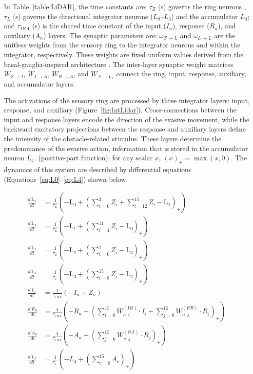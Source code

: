 In Table~\ref{table:LiDAR}, the time constants are: $\tau_{Z}$ (s) governs the ring neurons , $\tau_{L}$ (s) governs the directional integrator neurons ($L_0$--$L_3$) and the accumulator $L_4$; and $\tau_{IRA}$ (s) is the shared time constant of the input ($I_n$), response ($R_n$), and auxiliary ($A_n$) layers.
The synaptic parameters are:  $\omega_{Z\rightarrow L}$ and $\omega_{L\rightarrow L}$ are the unitless weights from the sensory ring to the integrator neurons and within the integrator, respectively. These weights are fixed uniform values derived from the basal-ganglia-inspired architecture \citep{sarvestani2013computational}.
The inter-layer synaptic weight matrices $W_{Z\rightarrow I}$, $W_{I\rightarrow R}$, $W_{R\rightarrow A}$, and $W_{A\rightarrow L_4}$ connect the ring, input, response, auxiliary, and accumulator layers.

The activations of the sensory ring are processed by three integrator layers: input, response, and auxiliary (Figure~\ref{fig:IntLidar}). Cross-connections between the input and response layers encode the direction of the evasive movement, while the backward excitatory projections between the response and auxiliary layers define the intensity of the obstacle-related stimulus. These layers determine the predominance of the evasive action, information that is stored in the accumulator neuron $L_4$.  (positive-part function): for any scalar $x$, $(x)_+ = \max(x,0)$. The dynamics of this system are described by differential equations (Equations~\eqref{eq:L0}--\eqref{eq:L4}) shown below. 

\begin{align}
\frac{d\, \text{L}_0}{dt} &= \frac{1}{\tau_{L}} \left( -\text{L}_0 + \left( \sum_{i=0}^{3} Z_i + \sum_{i=12}^{15} Z_i - \text{L}_1 \right)_+ \right)\label{eq:L0}\\
\frac{d\, \text{L}_1}{dt} &= \frac{1}{\tau_{L}} \left( -\text{L}_1 + \left( \sum_{i=4}^{11} Z_i - \text{L}_0 \right)_+ \right)\label{eq:L1}\\
\frac{d\, \text{L}_2}{dt} &= \frac{1}{\tau_{L}} \left( -\text{L}_2 + \left( \sum_{i=0}^{7} Z_i - \text{L}_3 \right)_+ \right)\label{eq:L2}\\
\frac{d\, \text{L}_3}{dt} &= \frac{1}{\tau_{L}} \left( -\text{L}_3 + \left( \sum_{i=8}^{15} Z_i - \text{L}_2 \right)_+ \right)\label{eq:L3}\\
\frac{d\, I_n}{dt} &= \frac{1}{\tau_{IRA}} \left( -I_n + Z_n \right)\label{eq:InputL}\\
\frac{d\, R_n}{dt} &= \frac{1}{\tau_{IRA}} \left( -R_n + \left(\sum_{i=0}^{15} W^{(IR)}_{n,i} \cdot I_i + \sum_{j=0}^{15} W^{(RR)}_{n,j} \cdot R_j \right)_+\right)\label{eq:ResL}\\
\frac{d\, A_n}{dt} &= \frac{1}{\tau_{IRA}} \left( -A_n + \left(\sum_{j=0}^{15} W^{(RA)}_{n,j} \cdot R_j \right)_+ \right)\label{eq:AuxL}\\
\frac{d\, L_4}{dt} &= \frac{1}{\tau_L} \left( -L_4 + \left(\sum_{r=0}^{15} A_r \right) _+\right)\label{eq:L4}
\end{align}

